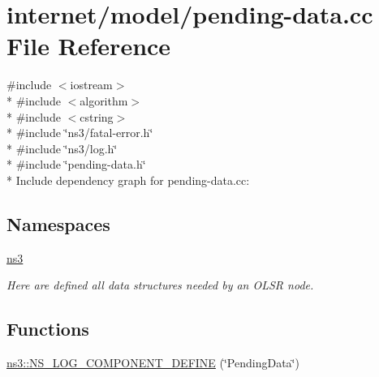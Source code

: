 \hypertarget{pending-data_8cc}{}\section{internet/model/pending-\/data.cc File Reference}
\label{pending-data_8cc}
{\ttfamily \#include $<$iostream$>$}\\*
{\ttfamily \#include $<$algorithm$>$}\\*
{\ttfamily \#include $<$cstring$>$}\\*
{\ttfamily \#include \char`\"{}ns3/fatal-\/error.\+h\char`\"{}}\\*
{\ttfamily \#include \char`\"{}ns3/log.\+h\char`\"{}}\\*
{\ttfamily \#include \char`\"{}pending-\/data.\+h\char`\"{}}\\*
Include dependency graph for pending-\/data.cc\+:
\subsection*{Namespaces}
\begin{DoxyCompactItemize}
\item 
 \hyperlink{namespacens3}{ns3}
\begin{DoxyCompactList}\small\item\em Here are defined all data structures needed by an O\+L\+SR node. \end{DoxyCompactList}\end{DoxyCompactItemize}
\subsection*{Functions}
\begin{DoxyCompactItemize}
\item 
\hyperlink{namespacens3_ae5cc2cfe91f938e034b972a1207253a3}{ns3\+::\+N\+S\+\_\+\+L\+O\+G\+\_\+\+C\+O\+M\+P\+O\+N\+E\+N\+T\+\_\+\+D\+E\+F\+I\+NE} (\char`\"{}Pending\+Data\char`\"{})
\end{DoxyCompactItemize}
